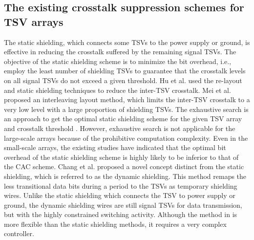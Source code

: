 \documentclass[lettersize,journal]{IEEEtran}
\begin{document}
\subsection{The existing crosstalk suppression schemes for TSV arrays}\label{subsec-pre-relatedWorks}
The static shielding, which connects some TSVs to the power supply or ground, is effective in reducing the crosstalk suffered by the remaining signal TSVs. The objective of the static shielding scheme is to minimize the bit overhead, i.e., employ the least number of shielding TSVs to guarantee that the crosstalk levels on all signal TSVs do not exceed a given threshold. Hu et al. \cite{A12_Hu_7517149} used the re-layout and static shielding techniques to reduce the inter-TSV crosstalk. Mei et al. \cite{A13_Mei_8480511} proposed an interleaving layout method, which limits the inter-TSV crosstalk to a very low level with a large proportion of shielding TSVs. The exhaustive search is an approach to get the optimal static shielding scheme for the given TSV array and crosstalk threshold \cite{A14_Cui_8480772}. However, exhaustive search is not applicable for the large-scale arrays because of the prohibitive computation complexity. Even in the small-scale arrays, the existing studies have indicated that the optimal bit overhead of the static shielding scheme is highly likely to be inferior to that of the CAC scheme. Chang et al. \cite{A15_Chang_6509678} proposed a novel concept distinct from the static shielding, which is referred to as the dynamic shielding. This method remaps the less transitional data bits during a period to the TSVs as temporary shielding wires. Unlike the static shielding which connects the TSV to power supply or ground, the dynamic shielding wires are still signal TSVs for data transmission, but with the highly constrained switching activity. Although the method in \cite{A15_Chang_6509678} is more flexible than the static shielding methods, it requires a very complex controller.
\end{document}
